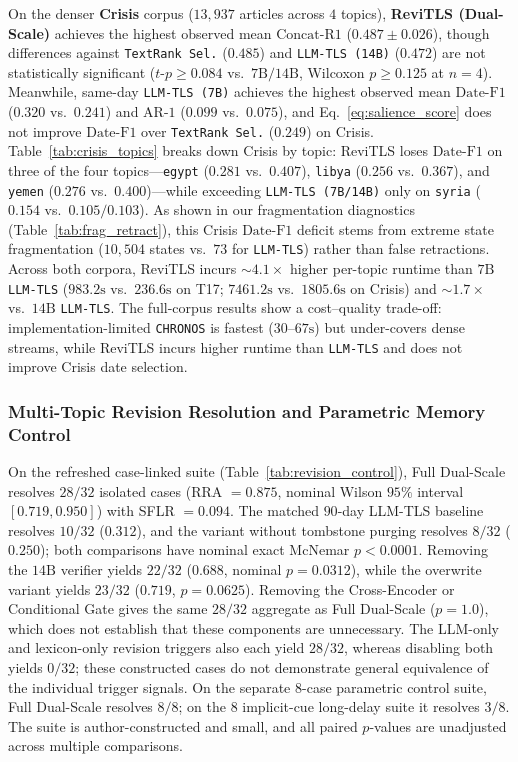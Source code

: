 \documentclass[journal]{IEEEtran}
\begin{document}
On the denser \textbf{Crisis} corpus ($13{,}937$ articles across $4$ topics), \textbf{ReviTLS (Dual-Scale)} achieves the highest observed mean $\text{Concat-R1}$ ($0.487 \pm 0.026$), though differences against \texttt{TextRank Sel.} ($0.485$) and \texttt{LLM-TLS (14B)} ($0.472$) are not statistically significant ($t\text{-}p \ge 0.084$ vs.\ $7\text{B}/14\text{B}$, Wilcoxon $p \ge 0.125$ at $n=4$). Meanwhile, same-day \texttt{LLM-TLS (7B)} achieves the highest observed mean $\text{Date-F1}$ ($0.320$ vs.\ $0.241$) and $\text{AR-1}$ ($0.099$ vs.\ $0.075$), and Eq.~\eqref{eq:salience_score} does not improve $\text{Date-F1}$ over \texttt{TextRank Sel.} ($0.249$) on Crisis. Table~\ref{tab:crisis_topics} breaks down Crisis by topic: ReviTLS loses $\text{Date-F1}$ on three of the four topics---\texttt{egypt} ($0.281$ vs.\ $0.407$), \texttt{libya} ($0.256$ vs.\ $0.367$), and \texttt{yemen} ($0.276$ vs.\ $0.400$)---while exceeding \texttt{LLM-TLS (7B/14B)} only on \texttt{syria} ($0.154$ vs.\ $0.105/0.103$). As shown in our fragmentation diagnostics (Table~\ref{tab:frag_retract}), this Crisis $\text{Date-F1}$ deficit stems from extreme state fragmentation ($10{,}504$ states vs.\ $73$ for \texttt{LLM-TLS}) rather than false retractions. Across both corpora, ReviTLS incurs $\sim 4.1\times$ higher per-topic runtime than $7\text{B}$ \texttt{LLM-TLS} ($983.2\text{s}$ vs.\ $236.6\text{s}$ on T17; $7461.2\text{s}$ vs.\ $1805.6\text{s}$ on Crisis) and $\sim 1.7\times$ vs.\ $14\text{B}$ \texttt{LLM-TLS}. The full-corpus results show a cost--quality trade-off: implementation-limited \texttt{CHRONOS} is fastest ($30\text{--}67\text{s}$) but under-covers dense streams, while ReviTLS incurs higher runtime than \texttt{LLM-TLS} and does not improve Crisis date selection.

\subsubsection{Multi-Topic Revision Resolution and Parametric Memory Control}
On the refreshed case-linked suite (Table~\ref{tab:revision_control}), Full Dual-Scale resolves $28/32$ isolated cases (RRA $=0.875$, nominal Wilson $95\%$ interval $[0.719,0.950]$) with SFLR $=0.094$. The matched $90$-day LLM-TLS baseline resolves $10/32$ ($0.312$), and the variant without tombstone purging resolves $8/32$ ($0.250$); both comparisons have nominal exact McNemar $p<0.0001$. Removing the $14\text{B}$ verifier yields $22/32$ ($0.688$, nominal $p=0.0312$), while the overwrite variant yields $23/32$ ($0.719$, $p=0.0625$). Removing the Cross-Encoder or Conditional Gate gives the same $28/32$ aggregate as Full Dual-Scale ($p=1.0$), which does not establish that these components are unnecessary. The LLM-only and lexicon-only revision triggers also each yield $28/32$, whereas disabling both yields $0/32$; these constructed cases do not demonstrate general equivalence of the individual trigger signals. On the separate $8$-case parametric control suite, Full Dual-Scale resolves $8/8$; on the $8$ implicit-cue long-delay suite it resolves $3/8$. The suite is author-constructed and small, and all paired $p$-values are unadjusted across multiple comparisons.
\end{document}
